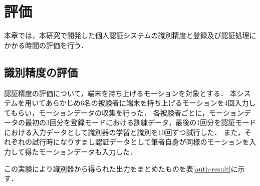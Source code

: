 \chapter{評価}
本章では，本研究で開発した個人認証システムの識別精度と登録及び認証処理にかかる時間の評価を行う．

\section{識別精度の評価}
認証精度の評価について，端末を持ち上げるモーションを対象とする．
本システムを用いてあらかじめ6名の被験者に端末を持ち上げるモーションを4回入力してもらい，モーションデータの収集を行った．
各被験者ごとに，モーションデータの最初の3回分を登録モードにおける訓練データ，最後の1回分を認証モードにおける入力データとして識別器の学習と識別を10回ずつ試行した．
また，それぞれの試行時になりすまし認証データとして筆者自身が同様のモーションを入力して得たモーションデータも入力した．

この実験により識別器から得られた出力をまとめたものを表\ref{auth-result}に示す．

